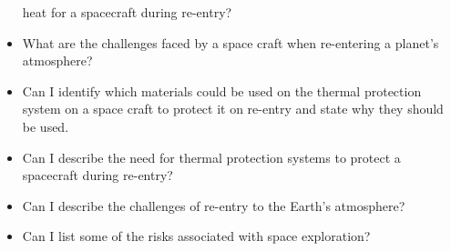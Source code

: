 \begin{multicols}{2}
\begin{itemize}
			heat for a spacecraft during re-entry?
		\item What are the challenges faced by a space craft when re-entering a
			planet's atmosphere?
		\item Can I identify which materials could be used on the thermal protection
			system on a space craft to protect it on re-entry and state why they should
			be used.
		\item Can I describe the need for thermal protection systems to protect
			a spacecraft during re-entry?
		\item Can I describe the challenges of re-entry to the Earth's atmosphere?
		\item Can I list some of the risks associated with space exploration?

	\end{itemize}
\end{multicols}

